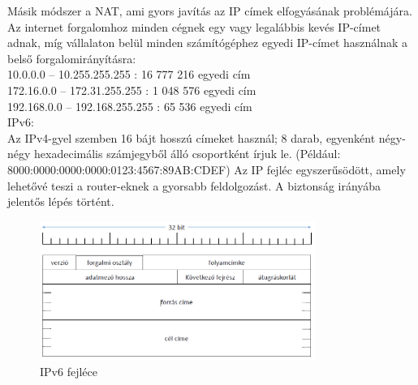 \documentclass[margin=0px]{article}
\begin{document}
\begin{description}
\begin{itemize}
								Másik módszer a NAT, ami gyors javítás az IP címek elfogyásának problémájára. Az internet forgalomhoz minden cégnek egy vagy legalábbis kevés IP-címet adnak, míg vállalaton belül minden számítógéphez egyedi IP-címet használnak a belső forgalomirányításra: \\
								10.0.0.0 – 10.255.255.255 : 16 777 216 egyedi cím\\
								172.16.0.0 – 172.31.255.255 : 1 048 576 egyedi cím\\
								192.168.0.0 – 192.168.255.255 : 65 536 egyedi cím\\
								
								IPv6:\\
								Az IPv4-gyel szemben 16 bájt hosszú címeket használ; 8 darab, egyenként négy-négy hexadecimális számjegyből álló csoportként írjuk le. (Például: 8000:0000:0000:0000:0123:4567:89AB:CDEF) Az IP fejléc egyszerűsödött, amely lehetővé teszi a router-eknek a gyorsabb feldolgozást. A biztonság irányába jelentős lépés történt. 
								
								\begin{figure}[H]
									\centering
									\includegraphics[width=0.8\textwidth]{img/ipv6.png}
									\caption{IPv6 fejléce}
								\end{figure}
								

\end{itemize}
\end{description}
\end{document}
